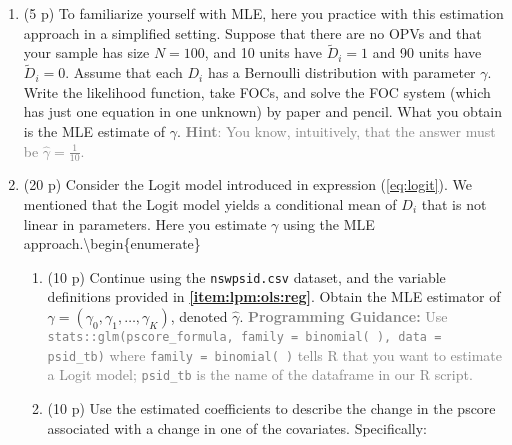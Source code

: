 \documentclass[
]{article}
\begin{document}


\begin{enumerate}
\def\labelenumi{\arabic{enumi}.}
\setcounter{enumi}{3}
\item
  (5 p) To familiarize yourself with MLE, here you practice with this
  estimation approach in a simplified setting. Suppose that there are no
  OPVs and that your sample has size \(N=100\), and 10 units have
  \(\tilde{D}_i=1\) and 90 units have \(\tilde{D}_i=0\). Assume that
  each \(D_i\) has a Bernoulli distribution with parameter \(\gamma\).
  Write the likelihood function, take FOCs, and solve the FOC system
  (which has just one equation in one unknown) by paper and pencil. What
  you obtain is the MLE estimate of \(\gamma\).
  \textcolor{gray}{\textbf{Hint}: You know, intuitively, that the answer must be $\hat{\gamma}=\frac{1}{10}$.}
\item
  (20 p) Consider the Logit model introduced in expression
  (\ref{eq:logit}). We mentioned that the Logit model yields a
  conditional mean of \(D_i\) that is not linear in parameters. Here you
  estimate \(\gamma\) using the MLE
  approach.\textbackslash begin\{enumerate\}

  \begin{enumerate}
  \def\labelenumii{\alph{enumii}.}
  \item
    (10 p) Continue using the \texttt{nswpsid.csv} dataset, and the
    variable definitions provided in \textbf{\ref{item:lpm:ols:reg}}.
    Obtain the MLE estimator of
    \(\gamma= (\gamma_0,\gamma_1,\dots,\gamma_K)\), denoted
    \(\hat{\gamma}\).
    \textcolor{gray}{\textbf{Programming Guidance:} Use \\ \texttt{stats::glm(pscore\_formula, family = binomial( ), data = psid\_tb)} where \texttt{family = binomial( )} tells R that you want to estimate a Logit model; \texttt{psid\_tb} is the name of the dataframe in our R script.}\label{item:logit:reg}
  \item
    (10 p) Use the estimated coefficients to describe the change in the
    pscore associated with a change in one of the covariates.
    Specifically:


\end{enumerate}
\end{enumerate}
\end{document}
